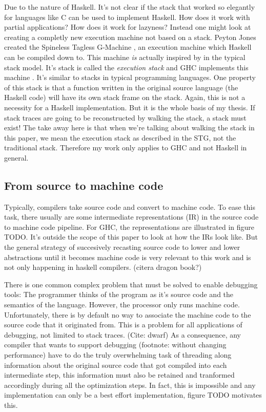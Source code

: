 Due to the nature of Haskell. It's not clear if the stack that worked so
elegantly for languages like C can be used to implement Haskell. How does it
work with partial applications? How does it work for lazyness? Instead one
might look at creating a completly new execution machine not based on a stack.
Peyton Jones created the Spineless Tagless G-Machine \cite{stg_1992}, an
execution machine which Haskell can be compiled down to. This machine \emph{is}
actually inspired by in the typical stack model. It's stack is called the
\emph{execution stack} and GHC implements this machine \cite{evalapplyjfp06}.
It's similar to stacks in typical programming languages. One property of this
stack is that a function written in the original source language (the Haskell
code) will have its own stack frame on the stack. Again, this is not a
necessity for a Haskell implementation. But it is the whole basis of my thesis.
If stack traces are going to be reconstructed by walking the stack, a stack
must exist! The take away here is that when we're talking about walking the
stack in this paper, we mean the execution stack as described in the STG, not
the traditional stack. Therefore my work only applies to GHC and not Haskell in
general.



\subsection{From source to machine code}

Typically, compilers take source code and convert to machine code. To ease this
task, there usually are some intermediate representations (IR) in the source
code to machine code pipeline.  For GHC, the representations are illustrated in
figure TODO. It's outside the scope of this paper to look at how the IRs
look like. But the general strategy of succesively recasting source code to lower and
lower abstractions until it becomes machine code is very relevant to this work
and is not only happening in haskell compilers. (citera dragon book?)

There is one common complex problem that must be solved to enable debugging
tools: The programmer thinks of the program as it's source code and the
semantics of the language. However, the processor only runs machine code.
Unfortunately, there is by default no way to associate the machine code to the
source code that it originated from. This is a problem for all applications of
debugging, not limited to stack traces. (Cite: dwarf) As a consequence, any
compiler that wants to support debugging (footnote: without changing
performance) have to do the truly overwhelming task of threading along
information about the original source code that got compiled into each
intermediate step, this information must also be retained and tranformed
accordingly during all the optimization steps. In fact, this is impossible and
any implementation can only be a best effort implementation, figure TODO
motivates this.

